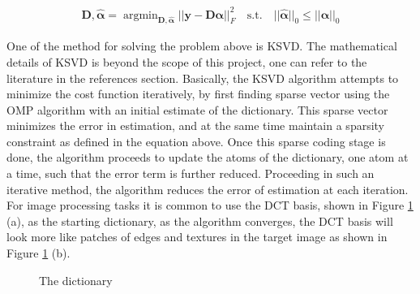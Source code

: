 \documentclass[12pt,letterpaper]{article}
\DeclareMathOperator*{\argmin}{argmin}
\begin{document}
\begin{align*}
    \bm{D},\hat{\bm{\alpha}} = \argmin_{\bm{D},\hat{\bm{\alpha}}} ||\bm{y}  - \bm{D}\bm{\alpha}||_F^2 \quad \textrm{s.t.}  \quad ||\hat{\bm{\alpha}}||_0 \le||\bm{\alpha}||_0
\end{align*}

One of the method for solving the problem above is KSVD. The mathematical details of KSVD is beyond the scope of this project, one can refer to the literature in the references section. Basically, the KSVD algorithm attempts to minimize the cost function iteratively, by first finding sparse vector using the OMP algorithm with an initial estimate of the dictionary. This sparse vector minimizes the error in estimation, and at the same time maintain a sparsity constraint as defined in the equation above.  Once this sparse coding stage is done, the algorithm proceeds to update the atoms of the dictionary, one atom at a time, such that the error term is further reduced. Proceeding in such an iterative method, the algorithm reduces the error of estimation at each iteration.
\\

For image processing tasks it is common to use the DCT basis, shown in Figure \ref{fig:cameraman_dict} (a), as the starting dictionary, as the algorithm converges, the DCT basis will look more like patches of edges and textures in the target image as shown in Figure \ref{fig:cameraman_dict} (b). 

\begin{figure}[ht]
    \centering
    \quad
    \caption{The dictionary}
    \label{fig:cameraman_dict}
\end{figure}  
  
\end{document}
